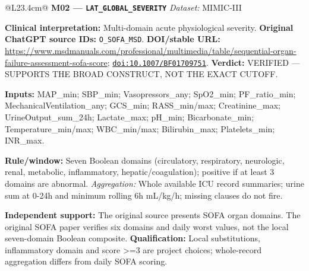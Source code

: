 \begin{tabular}{@{}L{23.4cm}@{}}
\textbf{M02 --- \nolinkurl{LAT_GLOBAL_SEVERITY}} \hfill \textit{Dataset:} MIMIC-III\par\textbf{Clinical interpretation:} Multi-domain acute physiological severity. \textbf{Original ChatGPT source IDs:} \nolinkurl{O_SOFA_MSD}. \textbf{DOI/stable URL:} \url{https://www.msdmanuals.com/professional/multimedia/table/sequential-organ-failure-assessment-sofa-score}; \allowbreak \href{https://doi.org/10.1007/BF01709751}{\nolinkurl{doi:10.1007/BF01709751}}. \textbf{Verdict:} VERIFIED --- SUPPORTS THE BROAD CONSTRUCT, NOT THE EXACT CUTOFF.\par\textbf{Inputs:} MAP\_min; SBP\_min; Vasopressors\_any; SpO2\_min; PF\_ratio\_min; MechanicalVentilation\_any; GCS\_min; RASS\_min/max; Creatinine\_max; UrineOutput\_sum\_24h; Lactate\_max; pH\_min; Bicarbonate\_min; Temperature\_min/max; WBC\_min/max; Bilirubin\_max; Platelets\_min; INR\_max.\par\textbf{Rule/window:} Seven Boolean domains (circulatory, respiratory, neurologic, renal, metabolic, inflammatory, hepatic/coagulation); positive if at least 3 domains are abnormal. \textit{Aggregation:} Whole available ICU record summaries; urine sum at 0-24h and minimum rolling 6h mL/kg/h; missing clauses do not fire.\par\textbf{Independent support:} The original source presents SOFA organ domains. The original SOFA paper verifies six domains and daily worst values, not the local seven-domain Boolean composite. \textbf{Qualification:} Local substitutions, inflammatory domain and score >=3 are project choices; whole-record aggregation differs from daily SOFA scoring. \\
\addlinespace[3pt]
\midrule

\end{tabular}
